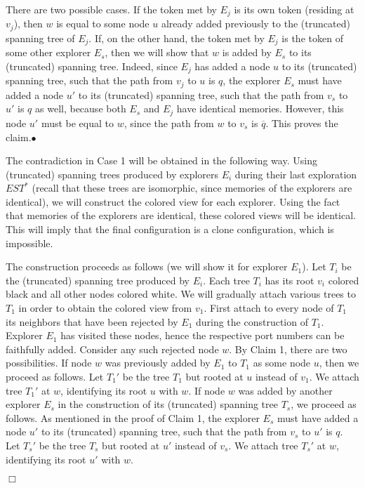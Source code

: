 \documentclass[11pt]{article}
\newcommand{\finclaim}{\hfill $\bullet$}
\newcommand{\qed}{\hfill $\Box$ \bigbreak}
\newenvironment{proof}{\noindent {\bf Proof.}}{\qed}
\begin{document}
\begin{proof}
There are two possible cases. If the token met by $E_j$ is its own token (residing at $v_j$), then $w$ is equal to some node $u$ already added previously
to the {(truncated) spanning} tree of $E_j$.  If, on the other hand, the token
met by $E_j$ is the token of some other explorer $E_s$, then we will show that $w$ is added by $E_s$ to its {(truncated) spanning tree}. 
Indeed, since $E_j$ has added a node $u$
to its {(truncated) spanning} tree, such that the path from $v_j$ to $u$ is $q$, the explorer $E_s$ must have added a node $u'$ to its {(truncated) spanning} tree, such that the path from $v_s$ to $u'$ is $q$
as well, because both $E_s$ and $E_j$ have identical memories. However, this node $u'$ must be equal to $w$, since the path from $w$ to $v_s$ is $\overline{q}$.
This proves the claim.\finclaim

The contradiction in Case 1 will be obtained in the following way. Using {(truncated) spanning} trees produced by explorers $E_i$ during their last exploration $EST^*$
(recall that these trees are isomorphic, since memories of the explorers are identical), we will construct the colored view for each explorer.
Using the fact that memories of the explorers are identical, these colored views will be identical. This will imply that the final configuration is a clone
configuration, which is impossible. 

The construction proceeds as follows (we will show it for explorer $E_1$). Let $T_i$ be the {(truncated) spanning} tree produced by $E_i$.
Each tree $T_i$ has its root $v_i$ colored black and all other nodes colored white. We will gradually
attach various trees to $T_1$ in order to obtain the colored view from $v_1$. 
First attach to every node of $T_1$ its neighbors that have been rejected by $E_1$ during the construction of $T_1$. Explorer $E_1$ has visited these
nodes, hence the respective port numbers can be faithfully added. Consider any such rejected node $w$.  By Claim 1, there are two possibilities.
If node $w$ was previously added by $E_1$ to $T_1$ as some node $u$, then we proceed as follows. Let $T_1'$ be the tree $T_1$ but rooted at $u$ instead of $v_1$.
We attach tree $T_1'$ at $w$, identifying its root $u$ with $w$.
If node $w$ was added  by another explorer $E_s$ in the construction of its {(truncated) spanning} tree $T_s$, we proceed as follows. 
As mentioned in the proof of Claim 1, the explorer $E_s$ must have added a node $u'$ to its {(truncated) spanning} tree, such that the path from $v_s$ to $u'$ is $q$.
Let $T_s'$ be the tree $T_s$ but rooted at $u'$ instead of $v_s$. We attach tree $T_s'$ at $w$, identifying its root $u'$ with $w$.


\end{proof}
\end{document}
